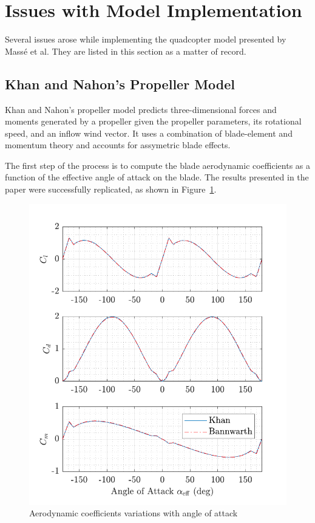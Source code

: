 \documentclass[a4paper,12pt]{article}
\begin{document}
    \newpage
    \section{Issues with Model Implementation}\label{sec:issues}

        Several issues arose while implementing the quadcopter model presented by Mass{\'e} et al. They are listed in this section as a matter of record.

        \subsection{Khan and Nahon's Propeller Model}

            Khan and Nahon's propeller model predicts three-dimensional forces and moments generated by a propeller given the propeller parameters, its rotational speed, and an inflow wind vector. It uses a combination of blade-element and momentum theory and accounts for assymetric blade effects.

            The first step of the process is to compute the blade aerodynamic coefficients as a function of the effective angle of attack on the blade. The results presented in the paper were successfully replicated, as shown in Figure~\ref{fig:aero_coefs}.

            \begin{figure}[h!]
                \centering%
                \includegraphics{aero_coefs.pdf}%
                \caption{Aerodynamic coefficients variations with angle of attack}\label{fig:aero_coefs}
            \end{figure}
\end{document}
